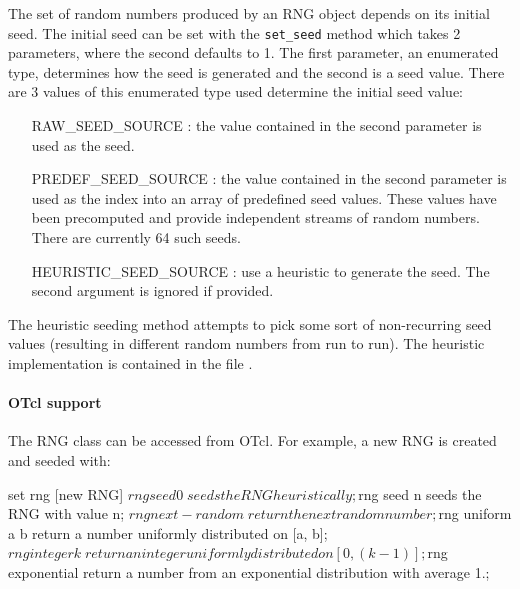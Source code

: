 The set of random numbers produced by an RNG object depends on its
initial seed.  The initial seed can be set with the {\tt set\_seed} method
which takes 2 parameters, where the second
defaults to 1.  The first parameter, an enumerated type,
determines how
the seed is generated and the second is a seed value.  There are 3
values of this enumerated type used determine the initial seed value:

\begin{itemize}

\item[RAW\_SEED\_SOURCE]:  the value contained in the second parameter is used
as the seed.

\item [PREDEF\_SEED\_SOURCE]:  the value contained in the second parameter is
used as the index into an array of predefined seed values.  These
values have been precomputed and provide independent streams of random
numbers.  There are currently 64 such seeds.

\item [HEURISTIC\_SEED\_SOURCE]: use a heuristic to generate the seed.
The second argument is ignored if provided.
\end{itemize}

The heuristic seeding method
attempts to pick some sort of non-recurring seed values (resulting
in different random numbers from run to run).  The heuristic implementation
is contained in the file .

\paragraph{OTcl support}
The RNG class can be accessed from OTcl.  For example, a new RNG is
created and seeded with:

\begin{program}
set rng [new RNG]
$rng seed 0 \; seeds the RNG heuristically;
$rng seed n \; seeds the RNG with value n;
$rng next-random \;  return the next random number;
$rng uniform a b \; return a number uniformly distributed on [a, b];
$rng integer k \; return an integer uniformly distributed on [0, (k-1)];
$rng exponential \; return a number from an exponential distribution with average 1.;
\end{program}

\subsection{}

